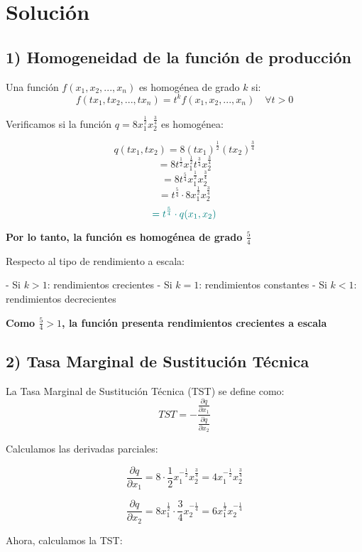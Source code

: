 \documentclass{article}
\begin{document}
\newpage
\section*{Solución}

\subsection*{1) Homogeneidad de la función de producción}

Una función \(f(x_1,x_2,...,x_n)\) es homogénea de grado \(k\) si:
\[
f(tx_1,tx_2,...,tx_n) = t^k f(x_1,x_2,...,x_n) \quad \forall t > 0
\]

Verificamos si la función \(q = 8x_1^{\frac{1}{2}}x_2^{\frac{3}{4}}\) es homogénea:

\[
q(tx_1,tx_2) = 8(tx_1)^{\frac{1}{2}}(tx_2)^{\frac{3}{4}}
\]
\[
= 8t^{\frac{1}{2}}x_1^{\frac{1}{2}}t^{\frac{3}{4}}x_2^{\frac{3}{4}}
\]
\[
= 8t^{\frac{5}{4}}x_1^{\frac{1}{2}}x_2^{\frac{3}{4}}
\]
\[
= t^{\frac{5}{4}} \cdot 8x_1^{\frac{1}{2}}x_2^{\frac{3}{4}}
\]
\[
\color{teal}
= t^{\frac{5}{4}} \cdot q(x_1,x_2)
\]

\textbf{\color{teal}Por lo tanto, la función es homogénea de grado \(\frac{5}{4}\)}

Respecto al tipo de rendimiento a escala:

- Si \(k > 1\): rendimientos crecientes
- Si \(k = 1\): rendimientos constantes
- Si \(k < 1\): rendimientos decrecientes

\textbf{\color{teal}Como \(\frac{5}{4} > 1\), la función presenta rendimientos crecientes a escala}

\subsection*{2) Tasa Marginal de Sustitución Técnica}

La Tasa Marginal de Sustitución Técnica (TST) se define como:
\[
TST = -\frac{\frac{\partial q}{\partial x_1}}{\frac{\partial q}{\partial x_2}}
\]

Calculamos las derivadas parciales:

\[
\frac{\partial q}{\partial x_1} = 8 \cdot \frac{1}{2} x_1^{-\frac{1}{2}} x_2^{\frac{3}{4}}
= 4 x_1^{-\frac{1}{2}} x_2^{\frac{3}{4}}
\]

\[
\frac{\partial q}{\partial x_2} = 8 x_1^{\frac{1}{2}} \cdot \frac{3}{4} x_2^{-\frac{1}{4}}
= 6 x_1^{\frac{1}{2}} x_2^{-\frac{1}{4}}
\]

Ahora, calculamos la TST:
\end{document}
